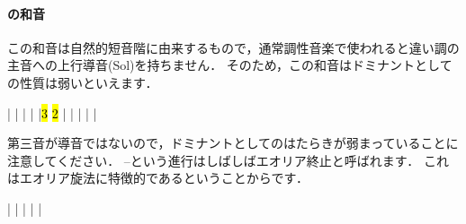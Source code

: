 \documentclass[dvipdfmx,uplatex,b5paper,openany,jbase=12Q,nomag*,textwidth-limit=44%
               ]{gachimuchi}[2020/05/05]
\begin{document}

\paragraph{\Gnv\Min の和音}
この和音は自然的短音階に由来するもので，通常調性音楽で使われる\Gnv と違い調の主音への上行導音(Sol\aSharp)を持ちません．
そのため，この和音はドミナントとしての性質は弱いといえます．

\begin{floatMusic}[pos=ht]
  \Startpiece%
  \znotes|\en
  \NOTes
  |%
  \en\bar
  \NOTEs
  |%
  \en\doublebar
  \NOTes
  |\hl{3}%
  \hl{2}%
  \en\bar
  \NOTEs
  |%
  \en\doublebar
  \NOTes
  |%
  \en\bar
  \NOTEs
  |%
  \en\setdoublebar
  \endpiece%
\end{floatMusic}

第三音が導音ではないので，ドミナントとしてのはたらきが弱まっていることに注意してください．
--という進行はしばしばエオリア終止と呼ばれます．
これはエオリア旋法に特徴的であるということからです．

\begin{floatMusic}[pos=ht]
  \Startpiece%
  \NOTes
  |%
  \en\bar
  \NOTes
  |%
  \en\bar
  \NOTes
  |%
  \en\setdoublebar
  \endpiece%
\end{floatMusic}
\end{document}
